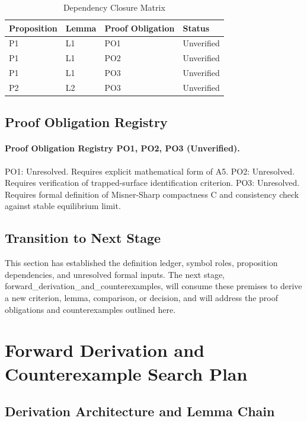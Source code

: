 \documentclass[conference]{IEEEtran}
\begin{document}
\begin{table}[htbp]
\centering
\footnotesize
\setlength{\tabcolsep}{3pt}
\renewcommand{\arraystretch}{1.12}
\caption{Dependency Closure Matrix}
\label{tab:definitions-and-propositions-def-08}
\begin{tabular}{|p{}|p{}|p{}|p{}|}
\hline
Proposition & Lemma & Proof Obligation & Status \\\hline
P1 & L1 & PO1 & Unverified \\\hline
P1 & L1 & PO2 & Unverified \\\hline
P1 & L1 & PO3 & Unverified \\\hline
P2 & L2 & PO3 & Unverified \\\hline
\end{tabular}
\end{table}

\subsection{Proof Obligation Registry}
\paragraph{Proof Obligation Registry PO1, PO2, PO3 (Unverified).} PO1: Unresolved. Requires explicit mathematical form of A5. PO2: Unresolved. Requires verification of trapped-surface identification criterion. PO3: Unresolved. Requires formal definition of Misner-Sharp compactness C and consistency check against stable equilibrium limit.

\subsection{Transition to Next Stage}
This section has established the definition ledger, symbol roles, proposition dependencies, and unresolved formal inputs. The next stage, forward\_derivation\_and\_counterexamples, will consume these premises to derive a new criterion, lemma, comparison, or decision, and will address the proof obligations and counterexamples outlined here.

\section{Forward Derivation and Counterexample Search Plan}
\subsection{Derivation Architecture and Lemma Chain}
\end{document}
